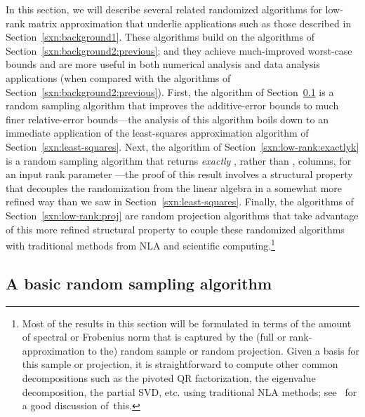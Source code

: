 \documentclass[twoside]{article}
\begin{document}
In this section, we will describe several related randomized algorithms 
for low-rank matrix approximation that underlie applications such as those 
described in Section~\ref{sxn:background1}.
These algorithms build on the algorithms of 
Section~\ref{sxn:background2:previous}; and they achieve much-improved
worst-case bounds and are more useful in both numerical analysis and data 
analysis applications (when compared with the algorithms of Section~\ref{sxn:background2:previous}).
First, the algorithm of Section~\ref{sxn:low-rank:relerr} is a random 
sampling algorithm that improves the additive-error bounds to much finer 
relative-error bounds---the analysis of this algorithm boils down to an 
immediate application of the least-squares approximation algorithm of 
Section~\ref{sxn:least-squares}.
Next, the algorithm of Section~\ref{sxn:low-rank:exactlyk} is a random 
sampling algorithm that returns \emph{exactly} , rather than 
, columns, for an input rank parameter ---the 
proof of this result involves a structural property that decouples the 
randomization from the linear algebra in a somewhat more refined way than 
we saw in Section~\ref{sxn:least-squares}.
Finally, the algorithms of Section~\ref{sxn:low-rank:proj} are random 
projection algorithms that take advantage of this more refined structural 
property to couple these randomized algorithms with traditional methods 
from NLA and scientific computing.\footnote{Most of the results in this section will be formulated in terms of 
the amount of spectral or Frobenius norm that is captured by the (full or 
rank- approximation to the) random sample or random projection.
Given a basis for this sample or projection, it is straightforward to 
compute other common decompositions such as the pivoted QR factorization, 
the eigenvalue decomposition, the partial SVD, etc. using traditional NLA
methods; see~\cite{HMT09_SIREV} for a good discussion of~this.}





\subsection{A basic random sampling algorithm}
\label{sxn:low-rank:relerr}
\end{document}

